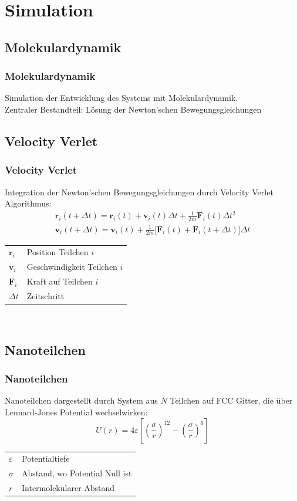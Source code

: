 \documentclass[handout]{beamer}
\begin{document}
\section{Simulation}
\subsection{Molekulardynamik}
\begin{frame}
\frametitle{Molekulardynamik}
Simulation der Entwicklung des Systems mit Molekulardynamik.\\
Zentraler Bestandteil: Lösung der Newton'schen Bewegungsgleichungen
\end{frame}

\subsection{Velocity Verlet}
\begin{frame}
\frametitle{Velocity Verlet}
Integration der Newton'schen Bewegungsgleichungen durch Velocity Verlet Algorithmus:
\begin{equation}
    \label{eq:velocityverlet}
    \begin{aligned}
        \mathbf{r}_i(t+\Delta t) = \mathbf{r}_i(t) + {\mathbf{v}}_i(t) \Delta t + \frac1{2m} {\mathbf{F}}_i(t) \Delta t^2\\
        \mathbf{v}_i(t+\Delta t) = \mathbf{v}_i(t) + \frac1{2m} \Big[\mathbf{F}_i(t) + \mathbf{F}_i(t+\Delta t)\Big] \Delta t
    \end{aligned}
\end{equation}
\begin{tabular}{l l}
$\mathbf{r}_i$ & Position Teilchen $i$\\
$\mathbf{v}_i$ & Geschwindigkeit Teilchen $i$\\
$\mathbf{F}_i$ & Kraft auf Teilchen $i$\\
$\Delta t$ & Zeitschritt\\
\end{tabular}\\
\end{frame}

\subsection{Nanoteilchen}

\begin{frame}
\frametitle{Nanoteilchen}
Nanoteilchen dargestellt durch System aus $N$ Teilchen auf FCC Gitter, die über Lennard-Jones Potential wechselwirken:
\begin{equation}
    \label{eq:lj}
    U(r) = 4\varepsilon\left[\left(\frac\sigma r\right)^{12} - \left(\frac\sigma r\right)^6\right]
\end{equation}
\begin{tabular}{l l}
$\varepsilon$ & Potentialtiefe\\
$\sigma$ & Abstand, wo Potential Null ist\\
$r$ & Intermolekularer Abstand\\
\end{tabular}\\
\end{frame}
\end{document}
